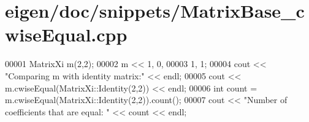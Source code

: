 \hypertarget{eigen_2doc_2snippets_2_matrix_base__cwise_equal_8cpp_source}{}\section{eigen/doc/snippets/\+Matrix\+Base\+\_\+cwise\+Equal.cpp}
\label{eigen_2doc_2snippets_2_matrix_base__cwise_equal_8cpp_source}

\begin{DoxyCode}
00001 MatrixXi m(2,2);
00002 m << 1, 0,
00003      1, 1;
00004 cout << \textcolor{stringliteral}{"Comparing m with identity matrix:"} << endl;
00005 cout << m.cwiseEqual(MatrixXi::Identity(2,2)) << endl;
00006 \textcolor{keywordtype}{int} count = m.cwiseEqual(MatrixXi::Identity(2,2)).count();
00007 cout << \textcolor{stringliteral}{"Number of coefficients that are equal: "} << count << endl;
\end{DoxyCode}
